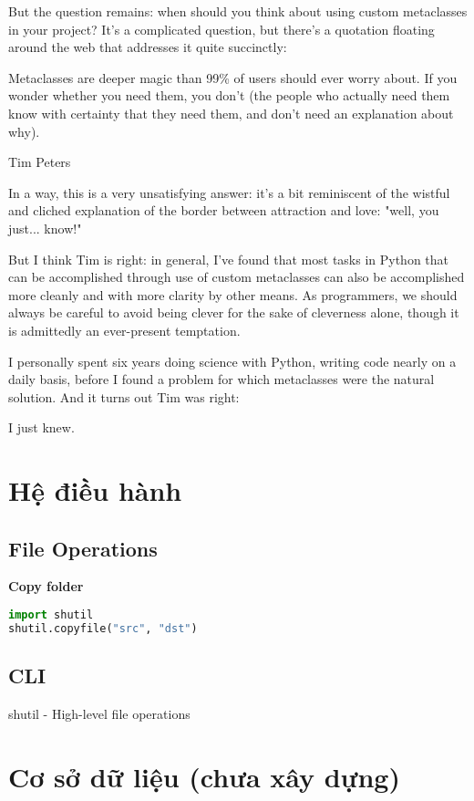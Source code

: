 But the question remains: when should you think about using custom metaclasses in your project? It's a complicated question, but there's a quotation floating around the web that addresses it quite succinctly:

Metaclasses are deeper magic than 99\% of users should ever worry about. If you wonder whether you need them, you don't (the people who actually need them know with certainty that they need them, and don't need an explanation about why).

Tim Peters

In a way, this is a very unsatisfying answer: it's a bit reminiscent of the wistful and cliched explanation of the border between attraction and love: "well, you just... know!"

But I think Tim is right: in general, I've found that most tasks in Python that can be accomplished through use of custom metaclasses can also be accomplished more cleanly and with more clarity by other means. As programmers, we should always be careful to avoid being clever for the sake of cleverness alone, though it is admittedly an ever-present temptation.

I personally spent six years doing science with Python, writing code nearly on a daily basis, before I found a problem for which metaclasses were the natural solution. And it turns out Tim was right:

I just knew.

\section{Hệ điều hành}

\subsection{File Operations}

\textbf{Copy folder}

\begin{lstlisting}[language=Python]
import shutil
shutil.copyfile("src", "dst")
\end{lstlisting}


\subsection{CLI}

shutil - High-level file operations

\section{Cơ sở dữ liệu (chưa xây dựng)}

